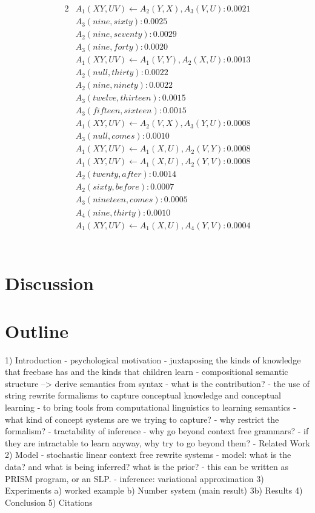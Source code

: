 \documentclass[11pt, twocolumn]{article}
\begin{document}
\begin{alignat*}{2}
&A_1(X Y, U V) \leftarrow A_2(Y, X), A_3(V, U) : 0.0021 \\
&A_3(nine, sixty) : 0.0025 \\
&A_2(nine, seventy) : 0.0029 \\
&A_3(nine, forty) : 0.0020 \\
&A_1(X Y, U V) \leftarrow A_1(V, Y), A_2(X, U) : 0.0013 \\
&A_2(null, thirty) : 0.0022 \\
&A_2(nine, ninety) : 0.0022 \\
&A_3(twelve, thirteen) : 0.0015 \\
&A_3(fifteen, sixteen) : 0.0015 \\
&A_1(X Y, U V) \leftarrow A_2(V, X), A_3(Y, U) : 0.0008 \\
&A_3(null, comes) : 0.0010 \\
&A_1(X Y, U V) \leftarrow A_1(X, U), A_2(V, Y) : 0.0008 \\
&A_1(X Y, U V) \leftarrow A_1(X, U), A_2(Y, V) : 0.0008 \\
&A_2(twenty, after) : 0.0014 \\
&A_2(sixty, before) : 0.0007 \\
&A_3(nineteen, comes) : 0.0005 \\
&A_4(nine, thirty) : 0.0010 \\
&A_1(X Y, U V) \leftarrow A_1(X, U), A_4(Y, V) : 0.0004 \\
\end{alignat*} \\
\section{Discussion}

\section{Outline}
1) Introduction
  - psychological motivation 
    - juxtaposing the kinds of knowledge that freebase has and the kinds that children learn
    - compositional semantic structure --> derive semantics from syntax
  - what is the contribution?
     - the use of string rewrite formalisms to capture conceptual knowledge and conceptual learning
     - to bring tools from computational linguistics to learning semantics
  - what kind of concept systems are we trying to capture?
  - why restrict the formalism? 
     - tractability of inference 
  - why go beyond context free grammars? 
     - if they are intractable to learn anyway, why try to go beyond them? 
  - Related Work
2) Model
- stochastic linear context free rewrite systems
  - model: what is the data? and what is being inferred? what is the prior? 
  - this can be written as PRISM program, or an SLP. 
  - inference: variational approximation 
3) Experiments
  a) worked example
  b) Number system (main result)
  3b) Results
4) Conclusion
5) Citations
\end{document}
